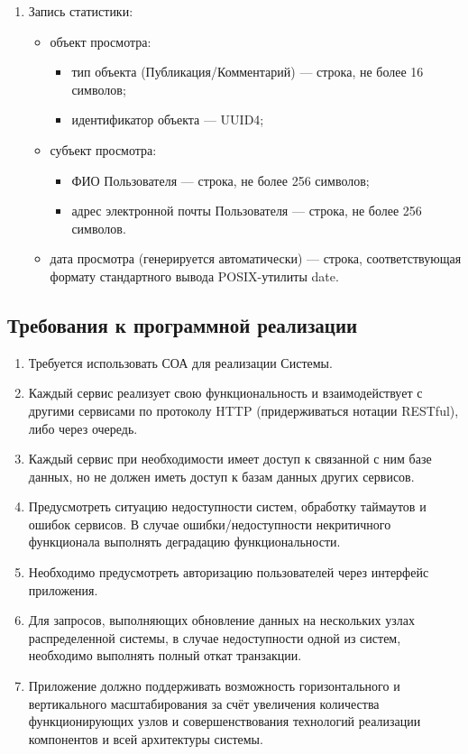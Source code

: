 \documentclass{bmstu-gost-7-32}
\begin{document}
\begin{enumerate}
	\item Запись статистики:
	\begin{itemize}
		\item объект просмотра:
		\begin{itemize}
			\item тип объекта (Публикация/Комментарий) — строка, не более 16 символов;
			\item идентификатор объекта — UUID4;
		\end{itemize}
		\item субъект просмотра:
		\begin{itemize}
			\item ФИО Пользователя — строка, не более 256 символов;
			\item адрес электронной почты Пользователя — строка, не более 256 символов.
		\end{itemize}
		\item дата просмотра (генерируется автоматически) — строка, соответствующая формату стандартного вывода POSIX-утилиты date.
	\end{itemize}
\end{enumerate}

\subsection{Требования к программной реализации}

\begin{enumerate}
	\item Требуется использовать СОА для реализации Системы.
	\item Каждый сервис реализует свою функциональность и взаимодействует с другими сервисами по протоколу HTTP (придерживаться нотации RESTful), либо через очередь.
	\item Каждый сервис при необходимости имеет доступ к связанной с ним базе данных, но не должен иметь доступ к базам данных других сервисов.
	\item Предусмотреть ситуацию недоступности систем, обработку таймаутов и ошибок сервисов.
	В случае ошибки/недоступности некритичного функционала выполнять деградацию функциональности.
	\item Необходимо предусмотреть авторизацию пользователей через
	интерфейс приложения.
	\item  Для запросов, выполняющих обновление данных на нескольких узлах распределенной системы, в случае недоступности одной из систем, необходимо выполнять полный откат транзакции.
	\item Приложение должно поддерживать возможность горизонтального и вертикального масштабирования за счёт увеличения количества функционирующих узлов и совершенствования технологий реализации компонентов и всей архитектуры системы.
\end{enumerate}
\end{document}
